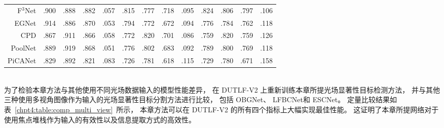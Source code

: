 \begin{table}[p]
{\begin{tabular}{rcccccccccccc}
			F$^{3}$Net  \upcite{wei2020f3net}
			& .900 & .888 & .882 & .057 
			& .815 & .777 & .718 & .095 
			& .824 & .806 & .797 & .106 
			\\ 
			
			
			EGNet   \upcite{zhao2019egnet}
			& .914 & .886 & .870 & .053 
			& .794 & .772 & .672 & .094 
			& .776 & .784 & .762 & .118 
			\\ 
			
			CPD  \upcite{wu2019cascaded}
			& .867 & .911 & .866 & .058 
			& .772 & .820 & .701 & .086 
			& .759 & .820 & .759 & .126 \\
			
			PoolNet \upcite{liu2019simple}
			& .889 & .919 & .868 & .051 
			& .776 & .802 & .683 & .092 
			& .789 & .800 & .769 & .118 \\
			
			PiCANet \upcite{liu2018picanet}
			& .829 & .892 & .821 & .083 
			& .726 & .781 & .618 & .115 
			& .729 & .780 & .671 & .158 \\
			
			
			\bottomrule[1.5pt] %
		\end{tabular}
	}
\end{table}
%
\\
%
%
%
\indent
为了检验本章方法与其他使用不同光场数据输入的模型性能差异，
在 DUTLF-V2 上重新训练本章所提光场显著性目标检测方法，
并与其他三种使用多视角图像作为输入的光场显著性目标分割方法进行比较，
包括 OBGNet、
LFBCNet和
ESCNet。 
定量比较结果如表~\ref{chpt4:table:comp_multi_view}~所示，
本章方法可以在 DUTLF-V2 的所有四个指标上大幅实现最佳性能。 
这证明了本章所提网络对于使用焦点堆栈作为输入的有效性以及信息提取方式的高效性。 
